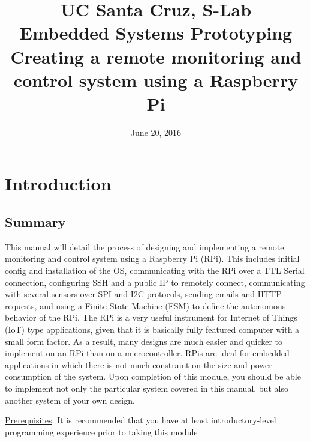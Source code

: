 \documentclass{article}
\title{
  UC Santa Cruz, S-Lab \\
  \colorbox{BurntOrange}{\textbf{Embedded Systems Prototyping}} \\
  Creating a remote monitoring and control system using a Raspberry Pi \\
}
\date{June 20, 2016}
\begin{document}
\maketitle

\tableofcontents

\section{Introduction}
  \subsection{Summary}
  This manual will detail the process of designing and implementing a remote monitoring and control system using a Raspberry Pi (RPi). This includes initial config and installation of the OS, communicating with the RPi over a TTL Serial connection, configuring SSH and a public IP to remotely connect, communicating with several sensors over SPI and I2C protocols, sending emails and HTTP requests, and using a Finite State Machine (FSM) to define the autonomous behavior of the RPi.
  The RPi is a very useful instrument for Internet of Things (IoT) type applications, given that it is basically fully featured computer with a small form factor. As a result, many designs are much easier and quicker to implement on an RPi than on a microcontroller. RPis are ideal for embedded applications in which there is not much constraint on the size and power consumption of the system. Upon completion of this module, you should be able to implement not only the particular system covered in this manual, but also another system of your own design.

  \underline{Prerequisites}: It is recommended that you have at least introductory-level programming experience prior to taking this module
\end{document}
